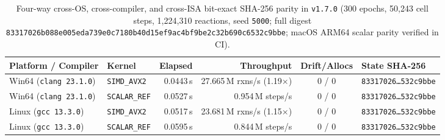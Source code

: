 \documentclass[11pt,reqno]{amsart}
\theoremstyle{plain}
\theoremstyle{definition}
\theoremstyle{remark}
\newcommand{\code}[1]{{\footnotesize\nolinkurl{#1}}}
\begin{document}
\begin{table}[ht]
\centering
\caption{Four-way cross-OS, cross-compiler, and cross-ISA bit-exact SHA-256 parity in \texttt{v1.7.0} (300 epochs, 50,243 cell steps, 1,224,310 reactions, seed \texttt{5000}; full digest \code{83317026b088e005eda739e0c7180b40d15ef9ac4bf9be2c32b690c6532c9bbe}; macOS ARM64 scalar parity verified in CI).}
\label{tab:parity}
\scriptsize
\setlength{\tabcolsep}{3.8pt}
\begin{tabular}{@{} l l r r c l @{}}
\toprule
\textbf{Platform / Compiler} & \textbf{Kernel} & \textbf{Elapsed} & \textbf{Throughput} & \textbf{Drift/Allocs} & \textbf{State SHA-256} \\
\midrule
Win64 (\texttt{clang 23.1.0}) & \texttt{SIMD\_AVX2}  & 0.0443\,s & 27.665\,M rxns/s (1.19$\times$) & 0 / 0 & \texttt{83317026\ldots 532c9bbe} \\
Win64 (\texttt{clang 23.1.0}) & \texttt{SCALAR\_REF} & 0.0527\,s & 0.954\,M steps/s                & 0 / 0 & \texttt{83317026\ldots 532c9bbe} \\
Linux (\texttt{gcc 13.3.0})   & \texttt{SIMD\_AVX2}  & 0.0517\,s & 23.681\,M rxns/s (1.15$\times$) & 0 / 0 & \texttt{83317026\ldots 532c9bbe} \\
Linux (\texttt{gcc 13.3.0})   & \texttt{SCALAR\_REF} & 0.0595\,s & 0.844\,M steps/s                & 0 / 0 & \texttt{83317026\ldots 532c9bbe} \\
\bottomrule
\end{tabular}
\end{table}
\end{document}
